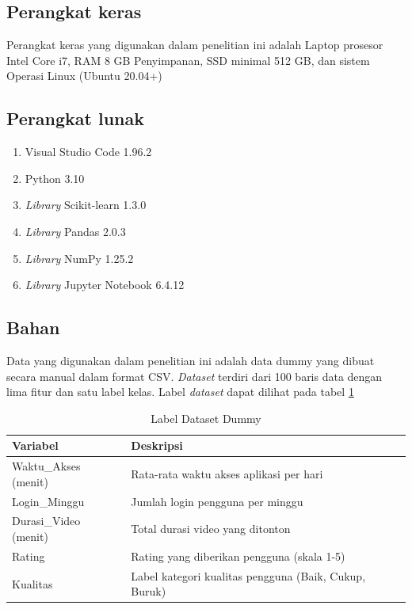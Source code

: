 \subsection{Perangkat keras} %
\par Perangkat keras yang digunakan dalam penelitian ini adalah Laptop prosesor Intel Core i7, RAM 8 GB Penyimpanan, SSD minimal 512 GB, dan sistem Operasi Linux (Ubuntu 20.04+)

\subsection{Perangkat lunak}
\begin{enumerate}
    \item[a.] Visual Studio Code 1.96.2
    \item[b.] Python 3.10
    \item[c.] \textit{Library} Scikit-learn 1.3.0
    \item[d.] \textit{Library} Pandas 2.0.3
    \item[e.] \textit{Library} NumPy 1.25.2
    \item[f.] \textit{Library} Jupyter Notebook 6.4.12
\end{enumerate}


\subsection{Bahan}
\par Data yang digunakan dalam penelitian ini adalah data dummy yang dibuat secara manual dalam format CSV. \textit{Dataset}  terdiri dari 100 baris data dengan lima fitur dan satu label kelas. Label \textit{dataset} dapat dilihat pada tabel \ref{tab:dummy_dataset_labels}
\begin{table}[H]
    \centering
    \caption{Label Dataset Dummy}
    \label{tab:dummy_dataset_labels}
    \begin{tabular}{|l|l|}
        \hline
        \textbf{Variabel} & \textbf{Deskripsi} \\
        \hline
        Waktu\_Akses (menit) & Rata-rata waktu akses aplikasi per hari \\        \hline
        Login\_Minggu & Jumlah login pengguna per minggu \\        \hline
        Durasi\_Video (menit) & Total durasi video yang ditonton \\        \hline
        Rating & Rating yang diberikan pengguna (skala 1-5) \\        \hline
        Kualitas & Label kategori kualitas pengguna (Baik, Cukup, Buruk) \\
        \hline
    \end{tabular}
\end{table}

